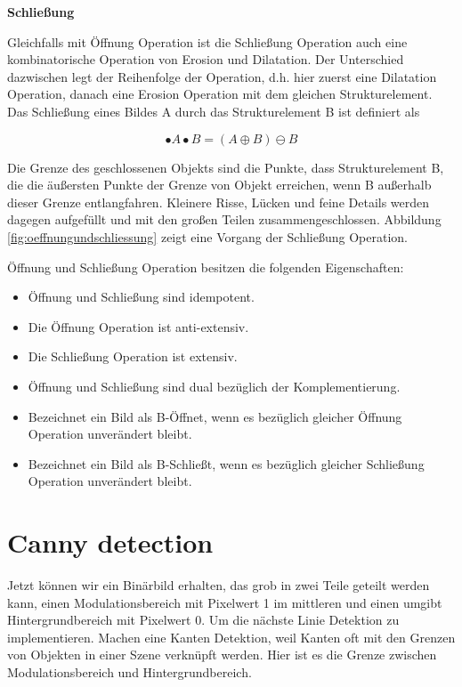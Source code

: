 \textbf{Schließung}

Gleichfalls mit Öffnung Operation ist die Schließung Operation auch eine kombinatorische Operation von Erosion und Dilatation. Der Unterschied dazwischen legt der Reihenfolge der Operation, d.h. hier zuerst eine Dilatation Operation, danach eine Erosion Operation mit dem gleichen Strukturelement. Das Schließung eines Bildes A durch das Strukturelement B ist definiert als

\begin{equation}
•A \bullet B =( A \oplus B )\ominus B  
\end{equation}

Die Grenze des geschlossenen Objekts sind die Punkte, dass Strukturelement B, die die äußersten Punkte der Grenze von Objekt erreichen, wenn B außerhalb dieser Grenze entlangfahren. Kleinere Risse, Lücken und feine Details werden dagegen aufgefüllt und mit den großen Teilen zusammengeschlossen. Abbildung \ref{fig:oeffnungundschliessung} zeigt eine Vorgang der Schließung Operation.


Öffnung und Schließung Operation besitzen die folgenden Eigenschaften:

\begin{itemize}

\item Öffnung und Schließung sind idempotent.
\item Die Öffnung Operation ist anti-extensiv. 
\item Die Schließung Operation ist extensiv.
\item Öffnung und Schließung sind dual bezüglich der Komplementierung.
\item Bezeichnet ein Bild als B-Öffnet, wenn es bezüglich gleicher Öffnung Operation unverändert bleibt. 
\item Bezeichnet ein Bild als B-Schließt, wenn es bezüglich gleicher Schließung Operation unverändert bleibt. 

\end{itemize}


\section{Canny detection}

Jetzt können wir ein Binärbild erhalten, das grob in zwei Teile geteilt werden kann, einen Modulationsbereich mit Pixelwert 1 im mittleren und einen umgibt Hintergrundbereich mit Pixelwert 0. Um die nächste Linie Detektion zu implementieren. Machen eine Kanten Detektion, weil Kanten oft mit den Grenzen von Objekten in einer Szene verknüpft werden. Hier ist es die Grenze zwischen Modulationsbereich und Hintergrundbereich. \cite{canny}

